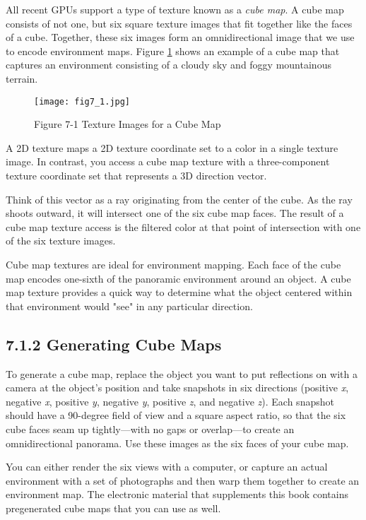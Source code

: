 \documentclass[../main.tex]{subfiles}
\begin{document}
All recent GPUs support a type of texture known as a \textit{cube map}. A cube map consists of not one, but six square texture images that fit together like the faces of a cube. Together, these six images form an omnidirectional image that we use to encode environment maps. Figure \ref{fig:7-1} shows an example of a cube map that captures an environment consisting of a cloudy sky and foggy mountainous terrain.

\begin{figure}
    \centering
    \texttt{[image: fig7\_1.jpg]}
    \caption{Figure 7-1 Texture Images for a Cube Map}
    \label{fig:7-1}
\end{figure}

A 2D texture maps a 2D texture coordinate set to a color in a single texture image. In contrast, you access a cube map texture with a three-component texture coordinate set that represents a 3D direction vector.

Think of this vector as a ray originating from the center of the cube. As the ray shoots outward, it will intersect one of the six cube map faces. The result of a cube map texture access is the filtered color at that point of intersection with one of the six texture images.

Cube map textures are ideal for environment mapping. Each face of the cube map encodes one-sixth of the panoramic environment around an object. A cube map texture provides a quick way to determine what the object centered within that environment would "see" in any particular direction.

\subsection{7.1.2 Generating Cube Maps}

To generate a cube map, replace the object you want to put reflections on with a camera at the object's position and take snapshots in six directions (positive \textit{x}, negative \textit{x}, positive \textit{y}, negative \textit{y}, positive \textit{z}, and negative \textit{z}). Each snapshot should have a 90-degree field of view and a square aspect ratio, so that the six cube faces seam up tightly—with no gaps or overlap—to create an omnidirectional panorama. Use these images as the six faces of your cube map.

You can either render the six views with a computer, or capture an actual environment with a set of photographs and then warp them together to create an environment map. The electronic material that supplements this book contains pregenerated cube maps that you can use as well.
\end{document}

